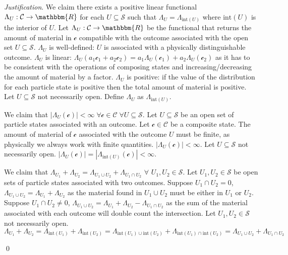 \documentclass[aps,pra,10pt,twocolumn,floatfix,nofootinbib]{revtex4-1}
\numberwithin{equation}{section}
\theoremstyle{definition}
\newenvironment{justification}{\emph{Justification}.}{\qed}
\begin{document}
\begin{justification}
	We claim there exists a positive linear functional $\Lambda_U : \mathcal{C} \rightarrow \mathbbm{R}$ for each $U \subseteq \mathcal{S}$ such that $\Lambda_U = \Lambda_{\mathrm{int}(U)}$ where $\mathrm{int}(U)$ is the interior of $U$. Let $\Lambda_{U} : \mathcal{C} \rightarrow \mathbbm{R}$ be the functional that returns the amount of material in $\mathcal{c}$ compatible with the outcome associated with the open set $U \subseteq \mathcal{S}$. $\Lambda_U$ is well-defined: $U$ is associated with a physically distinguishable outcome. $\Lambda_U$ is linear: $\Lambda_U(a_1 \mathcal{c}_1 + a_2 \mathcal{c}_2) = a_1 \Lambda_U(\mathcal{c}_1) + a_2 \Lambda_U(\mathcal{c}_2)$ as it has to be consistent with the operations of composing states and increasing/decreasing the amount of material by a factor. $\Lambda_U$ is positive: if the value of the distribution for each particle state is positive then the total amount of material is positive. Let $U \subseteq \mathcal{S}$ not necessarily open. Define $\Lambda_U$ as $\Lambda_{\mathrm{int}(U)}$.
	
	We claim that $|\Lambda_{U}(\mathcal{c})| < \infty \; \forall \mathcal{c} \in \mathcal{C} \; \forall U \subseteq \mathcal{S}$. Let $U \subseteq \mathcal{S}$ be an open set of particle states associated with an outcome. Let $\mathcal{c} \in \mathcal{C}$ be a composite state. The amount of material of $\mathcal{c}$ associated with the outcome $U$ must be finite, as physically we always work with finite quantities. $|\Lambda_{U}(\mathcal{c})| < \infty$. Let $U \subseteq \mathcal{S}$ not necessarily open. $|\Lambda_{U}(\mathcal{c})| = |\Lambda_{\mathrm{int}(U)}(\mathcal{c})| < \infty$.
	
	We claim that $\Lambda_{U_1} + \Lambda_{U_2} = \Lambda_{U_1 \cup U_2} + \Lambda_{U_1 \cap U_2}$ $\forall $ $U_1, U_2 \in \mathcal{S}$. Let $U_1, U_2 \in \mathcal{S}$ be open sets of particle states associated with two outcomes. Suppose $U_1 \cap U_2 = 0$, $\Lambda_{U_1 \cup U_2} = \Lambda_{U_1} + \Lambda_{U_2}$ as the material found in $U_1 \cup U_2$ must be either in $U_1$ or $U_2$. Suppose $U_1 \cap U_2 \neq 0$, $\Lambda_{U_1 \cup U_2} = \Lambda_{U_1} + \Lambda_{U_2} - \Lambda_{U_1 \cap U_2}$ as the sum of the material associated with each outcome will double count the intersection. Let $U_1, U_2 \in \mathcal{S}$ not necessarily open. $\Lambda_{U_1} + \Lambda_{U_2} = \Lambda_{\mathrm{int}(U_1)} + \Lambda_{\mathrm{int}(U_2)} = \Lambda_{\mathrm{int}(U_1) \cup \mathrm{int}(U_2)} + \Lambda_{\mathrm{int}(U_1) \cap \mathrm{int}(U_2)} = \Lambda_{U_1 \cup U_2} + \Lambda_{U_1 \cap U_2}$
	

\end{justification}
\end{document}
